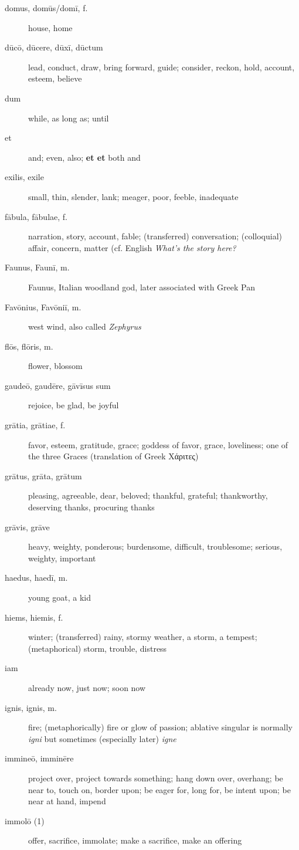 \begin{description}
    \item[domus, domūs/domī, f.] house, home
    \item[dūcō, dūcere, dūxī, dūctum] lead, conduct, draw, bring forward, guide; consider, reckon, hold, account, esteem, believe
    \item[dum] while, as long as; until
    \item[et] and; even, also; \textbf{et \lips et} both \lips and
    \item[exilis, exile] small, thin, slender, lank; meager, poor, feeble, inadequate
    \item[fābula, fābulae, f.] narration, story, account, fable; (transferred) conversation; (colloquial) affair, concern, matter (cf. English \textit{What's the story here?}
    \item[Faunus, Faunī, m.] Faunus, Italian woodland god, later associated with Greek Pan
    \item[Favōnius, Favōniī, m.] west wind, also called \textit{Zephyrus}
    \item[flōs, flōris, m.] flower, blossom
    \item[gaudeō, gaudēre, gāvīsus sum] rejoice, be glad, be joyful
    \item[grātia, grātiae, f.] favor, esteem, gratitude, grace; goddess of favor, grace, loveliness; one of the three Graces (translation of Greek Χάριτες)
    \item[grātus, grāta, grātum] pleasing, agreeable, dear, beloved; thankful, grateful; thankworthy, deserving thanks, procuring thanks
    \item[grāvis, grāve] heavy, weighty, ponderous; burdensome, difficult, troublesome; serious, weighty, important
    \item[haedus, haedī, m.] young goat, a kid
    \item[hiems, hiemis, f.] winter; (transferred) rainy, stormy weather, a storm, a tempest; (metaphorical) storm, trouble, distress 
    \item[iam] already now, just now; soon now
    \item[ignis, ignis, m.] fire; (metaphorically) fire or glow of passion; ablative singular is normally \textit{igni} but sometimes (especially later) \textit{igne} 
    \item[immineō, imminēre] project over, project towards something; hang down over, overhang; be near to, touch on, border upon; be eager for, long for, be intent upon; be near at hand, impend
    \item[immolō (1)] offer, sacrifice, immolate; make a sacrifice, make an offering

\end{description}
